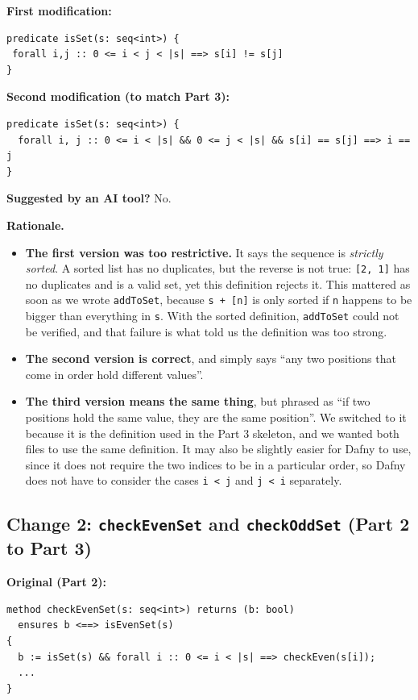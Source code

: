 \documentclass[11pt,a4paper]{article}
\newcommand{\aiflag}[1]{\par\noindent\textbf{Suggested by an AI tool?} #1\par}
\begin{document}
\textbf{First modification:}
\begin{lstlisting}
predicate isSet(s: seq<int>) {
 forall i,j :: 0 <= i < j < |s| ==> s[i] != s[j]
}
\end{lstlisting}

\textbf{Second modification (to match Part 3):}
\begin{lstlisting}
predicate isSet(s: seq<int>) {
  forall i, j :: 0 <= i < |s| && 0 <= j < |s| && s[i] == s[j] ==> i == j
}
\end{lstlisting}

\aiflag{No.}

\textbf{Rationale.}
\begin{itemize}
  \item \textbf{The first version was too restrictive.} It says the sequence is \emph{strictly sorted}. A sorted list has no duplicates, but the reverse is not true: \texttt{[2, 1]} has no duplicates and is a valid set, yet this definition rejects it. This mattered as soon as we wrote \texttt{addToSet}, because \texttt{s + [n]} is only sorted if \texttt{n} happens to be bigger than everything in \texttt{s}. With the sorted definition, \texttt{addToSet} could not be verified, and that failure is what told us the definition was too strong.
  \item \textbf{The second version is correct}, and simply says ``any two positions that come in order hold different values''.
  \item \textbf{The third version means the same thing}, but phrased as ``if two positions hold the same value, they are the same position''. We switched to it because it is the definition used in the Part 3 skeleton, and we wanted both files to use the same definition. It may also be slightly easier for Dafny to use, since it does not require the two indices to be in a particular order, so Dafny does not have to consider the cases \texttt{i < j} and \texttt{j < i} separately.
\end{itemize}

\subsection*{Change 2: \texttt{checkEvenSet} and \texttt{checkOddSet} (Part 2 to Part 3)}

\textbf{Original (Part 2):}
\begin{lstlisting}
method checkEvenSet(s: seq<int>) returns (b: bool)
  ensures b <==> isEvenSet(s)
{
  b := isSet(s) && forall i :: 0 <= i < |s| ==> checkEven(s[i]);
  ...
}
\end{lstlisting}
\end{document}
